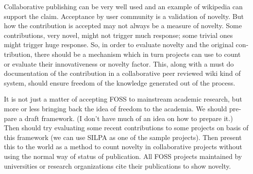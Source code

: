 \begin{english}
Collaborative publishing can be very well used and an example of wikipedia can support 
the claim. Acceptance by user community is a validation of novelty. But how the contribution is accepted may not always be a measure of novelty.
Some contributions, very novel, might not trigger much response; some
trivial ones might trigger huge response. So, in order to evaluate novelty and the
original contribution, there should be a mechanism which in turn projects
can use to count or evaluate their innovativeness or novelty factor.
This, along with a must do documentation of the contribution in a collaborative
peer reviewed wiki kind of system, should ensure freedom of the knowledge
generated out of the process.

It is not just a matter of accepting FOSS to mainstream academic research, but 
more or less bringing back the idea of freedom to the academia. We should prepare 
a draft framework. (I don't have much of an idea on how to prepare it.) Then should try 
evaluating some recent contributions to some projects on basis of this framework (we can 
use SILPA as one of the sample projects). Then present this to the world as a method
to count novelty in collaborative projects without using the normal way of
status of publication. All FOSS projects maintained by universities or research
organizations cite their publications to show novelty.
\end{english}
\newpage
